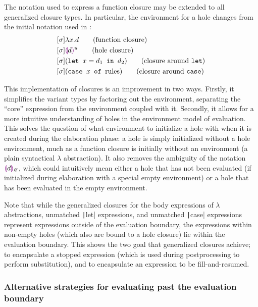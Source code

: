 The notation used to express a function closure may be extended to all generalized closure types. In particular, the environment for a hole changes from the initial notation used in \cite{conf/popl/HazelnutLive19}:
\begin{align}
  \label{eq:generalized-closure-notation}
  &[\env]\lambda x.d\tag{function closure} \\
  &[\env]\hhole{d}^u\tag{hole closure} \\
  &[\env](\texttt{let }x=d_1\texttt{ in }d_2)\tag{closure around \texttt{let}} \\
  &[\env](\texttt{case }x\texttt{ of }\text{rules})\tag{closure around \texttt{case}}
\end{align}

This implementation of closures is an improvement in two ways. Firstly, it simplifies the variant types by factoring out the environment, separating the ``core'' expression from the environment coupled with it. Secondly, it allows for a more intuitive understanding of holes in the environment model of evaluation. This solves the question of what environment to initialize a hole with when it is created during the elaboration phase: a hole is simply initialized without a hole environment, much as a function closure is initially without an environment (a plain syntactical $\lambda$ abstraction). It also removes the ambiguity of the notation $\textcolor{violet}{\llparenthesis} d\textcolor{violet}{\rrparenthesis}_\varnothing$, which could intuitively mean either a hole that has not been evaluated (if initialized during elaboration with a special empty environment) or a hole that has been evaluated in the empty environment.

Note that while the generalized closures for the body expressions of $\lambda$ abstractions, unmatched \texttt|let| expressions, and unmatched \texttt|case| expressions represent expressions outside of the evaluation boundary, the expressions within non-empty holes (which also are bound to a hole closure) lie within the evaluation boundary. This shows the two goal that generalized closures achieve; to encapsulate a stopped expression (which is used during postprocessing to perform substitution), and to encapsulate an expression to be fill-and-resumed.

\subsubsection{Alternative strategies for evaluating past the evaluation boundary}
\label{sec:alt_strat_unevaluated}

